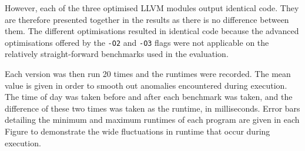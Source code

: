 However, each of the three optimised LLVM modules output identical code. They are therefore presented together in the results as there is no difference between them. The different optimisations resulted in identical code because the advanced optimisations offered by the \verb|-O2| and \verb|-O3| flags were not applicable on the relatively straight-forward benchmarks used in the evaluation.

Each version was then run 20 times and the runtimes were recorded. The mean value is given in order to smooth out anomalies encountered during execution. The time of day was taken before and after each benchmark was taken, and the difference of these two times was taken as the runtime, in milliseconds. Error bars detailing the minimum and maximum runtimes of each program are given in each Figure to demonstrate the wide fluctuations in runtime that occur during execution.
